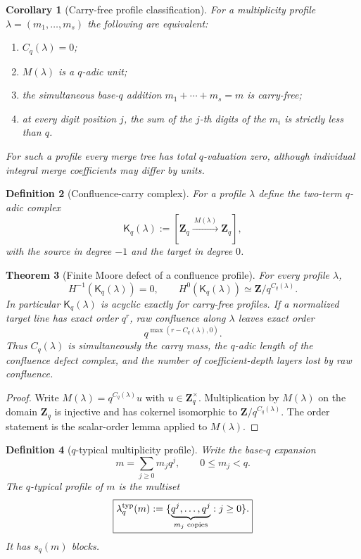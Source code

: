 \documentclass[11pt]{article}
\newtheorem{theorem}{Theorem}[section]
\newtheorem{corollary}[theorem]{Corollary}
\newtheorem{definition}[theorem]{Definition}
\theoremstyle{remark}
\newcommand{\Z}{\mathbf Z}
\begin{document}
\begin{corollary}[Carry-free profile classification]\label{P1C-cor:carry-free-profile}
For a multiplicity profile $\lambda=(m_1,\ldots,m_s)$ the following are equivalent:
\begin{enumerate}[label=\textup{(\roman*)}]
\item $C_q(\lambda)=0$;
\item $M(\lambda)$ is a $q$-adic unit;
\item the simultaneous base-$q$ addition $m_1+\cdots+m_s=m$ is carry-free;
\item at every digit position $j$, the sum of the $j$-th digits of the $m_i$ is strictly less than $q$.
\end{enumerate}
For such a profile every merge tree has total $q$-valuation zero, although individual integral merge coefficients may differ by units.
\end{corollary}

\begin{definition}[Confluence-carry complex]\label{P1C-def:confluence-carry-complex}
For a profile $\lambda$ define the two-term $q$-adic complex
\[
 \boxed{
 \mathsf K_q(\lambda)
 :=[\Z_q\xrightarrow{\ M(\lambda)\ }\Z_q],}
\]
with the source in degree $-1$ and the target in degree $0$.
\end{definition}

\begin{theorem}[Finite Moore defect of a confluence profile]\label{P1C-thm:confluence-carry-complex}
For every profile $\lambda$,
\[
 H^{-1}(\mathsf K_q(\lambda))=0,
 \qquad
 \boxed{H^0(\mathsf K_q(\lambda))\simeq\Z/q^{C_q(\lambda)}.}
\]
In particular $\mathsf K_q(\lambda)$ is acyclic exactly for carry-free profiles.  If a normalized target line has exact order $q^r$, raw confluence along $\lambda$ leaves exact order
\[
 \boxed{q^{\max(r-C_q(\lambda),0)}.}
\]
Thus $C_q(\lambda)$ is simultaneously the carry mass, the $q$-adic length of the confluence defect complex, and the number of coefficient-depth layers lost by raw confluence.
\end{theorem}

\begin{proof}
Write $M(\lambda)=q^{C_q(\lambda)}u$ with $u\in\Z_q^\times$.  Multiplication by $M(\lambda)$ on the domain $\Z_q$ is injective and has cokernel isomorphic to $\Z/q^{C_q(\lambda)}$.  The order statement is the scalar-order lemma applied to $M(\lambda)$.
\end{proof}

\begin{definition}[$q$-typical multiplicity profile]\label{P1C-def:q-typical-profile}
Write the base-$q$ expansion
\[
 m=\sum_{j\ge0}m_jq^j,
 \qquad 0\le m_j<q.
\]
The $q$-typical profile of $m$ is the multiset
\[
 \boxed{
 \lambda_q^{\rm typ}(m)
 :=\{\underbrace{q^j,\ldots,q^j}_{m_j\text{ copies}}:j\ge0\}.}
\]
It has $s_q(m)$ blocks.
\end{definition}
\end{document}
